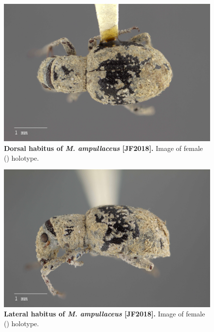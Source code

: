 \documentclass[fleqn,10pt,lineno]{wlpeerj} %
\begin{document}
\begin{figure}[h]
	\begin{sideways}
		\centering
		\includegraphics[height=\textwidth]{figure1.jpg}
	\end{sideways}
	\caption{\textbf{Dorsal habitus of \textit{M. ampullaceus} [JF2018].} Image of female (\female) holotype.}
	\label{fig:ampullaceus_F_dorsal}
\end{figure}

\begin{figure}[h]
	\begin{sideways}
		\centering
		\includegraphics[height=\textwidth]{figure2.jpg}
	\end{sideways}
	\caption{\textbf{Lateral habitus of \textit{M. ampullaceus} [JF2018].} Image of female (\female) holotype.}
	\label{fig:ampullaceus_F_lateral}
\end{figure}
\end{document}
